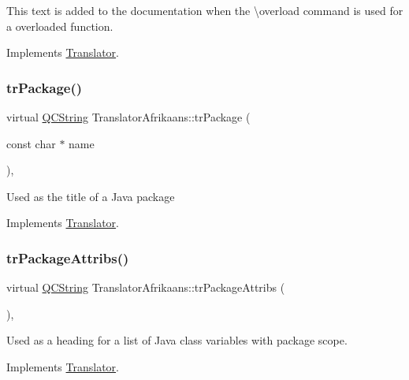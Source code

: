 This text is added to the documentation when the \textbackslash{}overload command is used for a overloaded function. 

Implements \mbox{\hyperlink{class_translator}{Translator}}.

\mbox{\label{class_translator_afrikaans_a76a7985dbe6066cf25719836104250c4}} 
\subsubsection{\texorpdfstring{trPackage()}{trPackage()}}
{\footnotesize\ttfamily virtual \mbox{\hyperlink{class_q_c_string}{Q\+C\+String}} Translator\+Afrikaans\+::tr\+Package (\begin{DoxyParamCaption}\item[{const char $\ast$}]{name }\end{DoxyParamCaption})\hspace{0.3cm}{\ttfamily [inline]}, {\ttfamily [virtual]}}

Used as the title of a Java package 

Implements \mbox{\hyperlink{class_translator}{Translator}}.

\mbox{\label{class_translator_afrikaans_ac468d74896f14b9b4eaafd1e06c7c8f4}} 
\subsubsection{\texorpdfstring{trPackageAttribs()}{trPackageAttribs()}}
{\footnotesize\ttfamily virtual \mbox{\hyperlink{class_q_c_string}{Q\+C\+String}} Translator\+Afrikaans\+::tr\+Package\+Attribs (\begin{DoxyParamCaption}{ }\end{DoxyParamCaption})\hspace{0.3cm}{\ttfamily [inline]}, {\ttfamily [virtual]}}

Used as a heading for a list of Java class variables with package scope. 

Implements \mbox{\hyperlink{class_translator}{Translator}}.

\mbox{\label{class_translator_afrikaans_a1bbf1fa9c0e0387cf018d0d385833f42}} 

